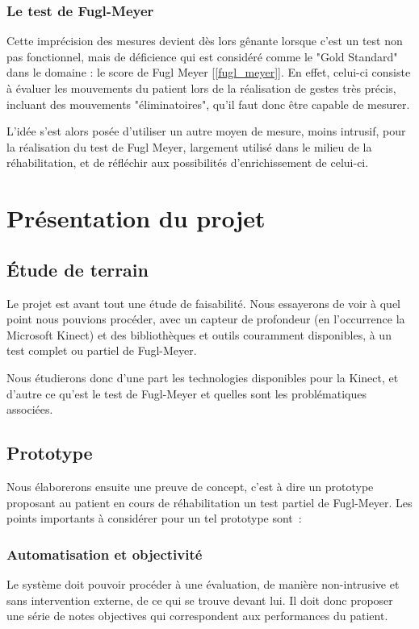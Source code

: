     \subsubsection{Le test de Fugl-Meyer}
Cette imprécision des mesures devient dès lors gênante lorsque c'est un test non pas fonctionnel, mais de déficience qui est considéré comme le "Gold Standard" dans le domaine : le score de Fugl Meyer [\ref{fugl_meyer}]. En effet, celui-ci consiste à évaluer les mouvements du patient lors de la réalisation de gestes très précis, incluant des mouvements "éliminatoires", qu'il faut donc être capable de mesurer.  
  
  L'idée s'est alors posée d'utiliser un autre moyen de mesure, moins intrusif, pour la réalisation du test de Fugl Meyer, largement utilisé dans le milieu de la réhabilitation, et de réfléchir aux possibilités d'enrichissement de celui-ci.
\newpage
    \section{Présentation du projet}
    
      \subsection{Étude de terrain} \label{etude_terrain}
    Le projet est avant tout une étude de faisabilité. Nous essayerons de voir
    à quel point nous pouvions procéder, avec un capteur de profondeur (en
    l'occurrence la Microsoft Kinect) et des bibliothèques et outils couramment 
    disponibles, à un test complet ou partiel de Fugl-Meyer.
    
    Nous étudierons donc d'une part les technologies disponibles pour la Kinect,
    et d'autre ce qu'est le test de Fugl-Meyer et quelles sont les 
    problématiques associées.
    
    \subsection{Prototype}
    Nous élaborerons ensuite une preuve de concept, c'est à dire un 
    prototype proposant au patient en cours de réhabilitation un test partiel 
    de Fugl-Meyer. Les points importants à considérer pour un tel prototype 
    sont~:
    \subsubsection{Automatisation et objectivité}
    Le système doit pouvoir procéder à une évaluation, de manière non-intrusive 
    et sans intervention externe, de ce qui se trouve devant lui. Il doit donc 
    proposer une série de notes objectives qui correspondent aux performances du 
    patient.
